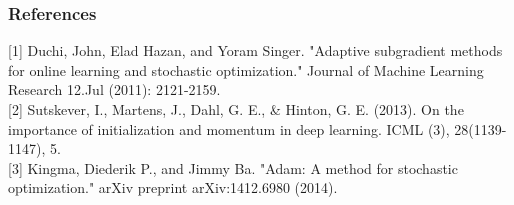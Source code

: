 \documentclass{beamer}
\begin{document}
\begin{frame}
\frametitle{References}
[1] Duchi, John, Elad Hazan, and Yoram Singer. "Adaptive subgradient methods for online learning and stochastic optimization." Journal of Machine Learning Research 12.Jul (2011): 2121-2159. \\

[2] Sutskever, I., Martens, J., Dahl, G. E., & Hinton, G. E. (2013). On the importance of initialization and momentum in deep learning. ICML (3), 28(1139-1147), 5. \\

[3] Kingma, Diederik P., and Jimmy Ba. "Adam: A method for stochastic optimization." arXiv preprint arXiv:1412.6980 (2014).

\end{frame}
\end{document}
